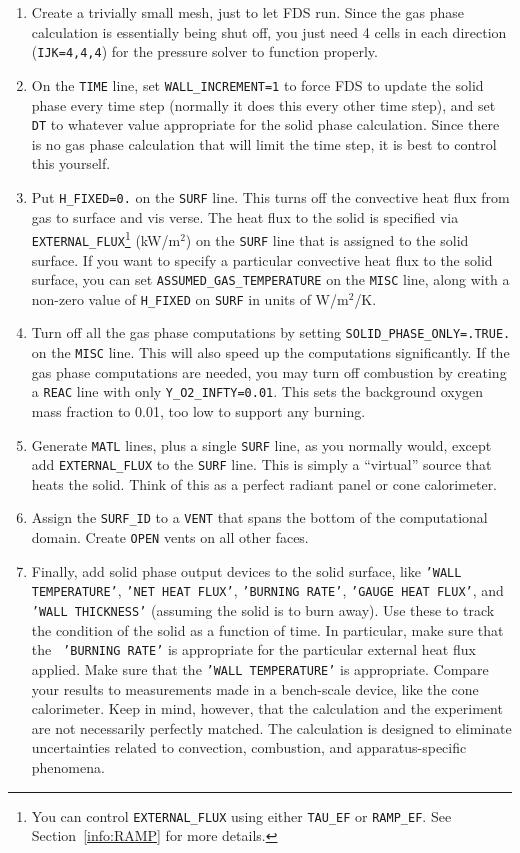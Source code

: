 \documentclass[11pt]{book}
\newcommand{\ct}{\tt\small}
\begin{document}
\begin{enumerate}
\item Create a trivially small mesh, just to let FDS run. Since the
gas phase calculation is essentially being shut off, you just need 4
cells in each direction ({\ct IJK=4,4,4}) for the pressure solver to
function properly.
\item On the {\ct TIME} line, set {\ct WALL\_INCREMENT=1} to force FDS
to update the solid phase every time step (normally it does this every
other time step), and set {\ct DT} to whatever value appropriate for
the solid phase calculation. Since there is no gas phase calculation
that will limit the time step, it is best to control this yourself.
\item Put {\ct H\_FIXED=0.} on the {\ct SURF} line. This turns off the
convective heat flux from gas to surface and vis verse. The heat flux
to the solid is specified via {\ct EXTERNAL\_FLUX}\footnote{You can control {\ct EXTERNAL\_FLUX} using
either {\ct TAU\_EF} or {\ct RAMP\_EF}. See Section~\ref{info:RAMP} for more details.} (kW/m$^2$) on the
{\ct SURF} line that is assigned to the solid surface. If you want to specify a particular
convective heat flux to the solid surface, you can set {\ct ASSUMED\_GAS\_TEMPERATURE} on the
{\ct MISC} line, along with a non-zero value of {\ct H\_FIXED} on {\ct SURF} in units of W/m$^2$/K.
\item Turn off all the gas phase computations by setting {\ct SOLID\_PHASE\_ONLY=.TRUE.}
on the {\ct MISC} line. This will also speed
up the computations significantly. If the gas phase computations are
needed, you may turn off combustion by creating a {\ct REAC} line with only
{\ct Y\_O2\_INFTY=0.01}. This sets the background oxygen mass fraction
to 0.01, too low to support any burning.
\item Generate {\ct MATL} lines, plus a single {\ct SURF} line, as you
normally would, except add {\ct EXTERNAL\_FLUX} to the {\ct SURF}
line. This is simply a ``virtual'' source that heats the solid. Think
of this as a perfect radiant panel or cone calorimeter.
\item Assign the {\ct SURF\_ID} to a {\ct VENT} that spans the bottom
of the computational domain. Create {\ct OPEN} vents on all other
faces.
\item Finally, add solid phase output devices to the solid surface,
like {\ct 'WALL TEMPERATURE'}, {\ct 'NET HEAT FLUX'}, {\ct 'BURNING RATE'},
{\ct 'GAUGE HEAT FLUX'}, and {\ct 'WALL THICKNESS'} (assuming the solid
is to burn away). Use these to track the condition of the solid as a
function of time. In particular, make sure that the {\ct
'BURNING RATE'} is appropriate for the particular external heat flux
applied. Make sure that the {\ct 'WALL TEMPERATURE'} is
appropriate. Compare your results to measurements made in a
bench-scale device, like the cone calorimeter. Keep in mind, however,
that the calculation and the experiment are not necessarily perfectly
matched. The calculation is designed to eliminate uncertainties
related to convection, combustion, and apparatus-specific phenomena.
\end{enumerate}
\end{document}

